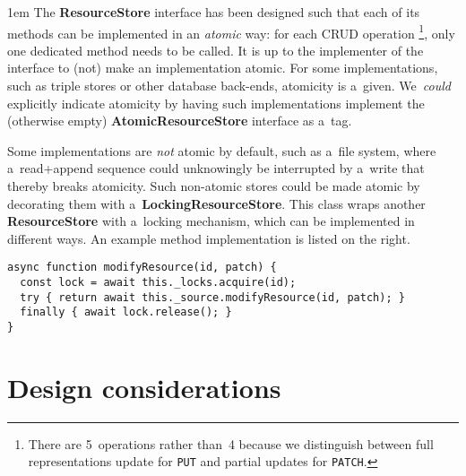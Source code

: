 \documentclass[10pt]{article}
\newenvironment{Note}
  {\begin{multicols}{3}%
     \parskip 1em}
  {\end{multicols}}
\begin{document}
\begin{Note}
The \textbf{ResourceStore} interface has been designed
such that each of its methods can be implemented
in an \emph{atomic} way:
for each CRUD operation%
\footnote{%
  There are 5~operations rather than~4
  because we distinguish between
  full representations update for \texttt{PUT}
  and partial updates for \texttt{PATCH}.
},
only one dedicated method needs to be called.
It is up to the implementer of the interface
to (not) make an implementation atomic.
For some implementations,
such as triple stores or other database back-ends,
atomicity is a~given.
We~\emph{could} explicitly indicate atomicity
by having such implementations
implement the (otherwise empty) \textbf{AtomicResourceStore} interface
as a~tag.

\columnbreak

Some implementations are \emph{not} atomic by default,
such as a~file system,
where a~read+append sequence could unknowingly
be interrupted by a~write
that thereby breaks atomicity.
Such non-atomic stores could be made atomic
by decorating them with a~\textbf{LockingResourceStore}.
This class wraps another \textbf{ResourceStore}
with a~locking mechanism,
which can be implemented in different ways.
An example method implementation is listed on the right.

\columnbreak

\begin{verbatim}
async function modifyResource(id, patch) {
  const lock = await this._locks.acquire(id);
  try { return await this._source.modifyResource(id, patch); }
  finally { await lock.release(); }
}
\end{verbatim}

\end{Note}

\section*{Design considerations}
\end{document}

